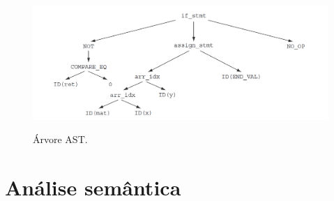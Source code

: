 	\begin{figure}[h]
		\center
		\includegraphics[width=1\textwidth]{Imagens/ArvoreAST}
		\label{Arvore AST}
		\caption{Árvore AST.}
	\end{figure}

	\section{Análise semântica}

